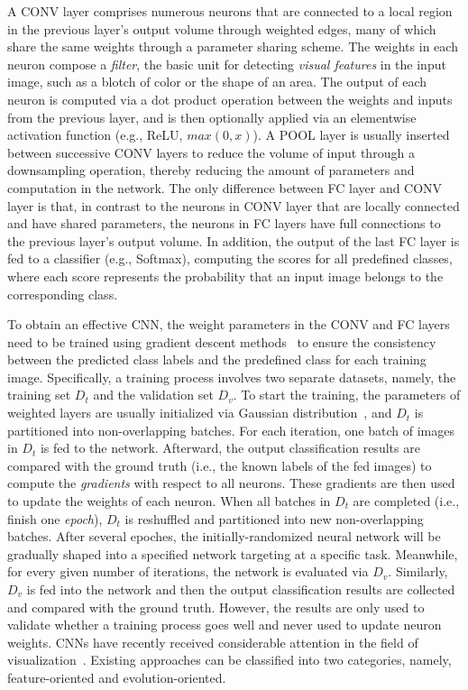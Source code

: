 \documentclass[format=acmsmall, review=false, screen=true]{acmart}
\begin{document}
A CONV layer comprises numerous neurons that are connected to a local region in the previous layer's output volume through weighted edges, many of which share the same weights through a parameter sharing scheme.
The weights in each neuron compose a \textit{filter}, the basic unit for detecting  \textit{visual features} in the input image, such as a blotch of color or the shape of an area.
The output of each neuron is computed via a dot product operation between the weights and inputs from the previous layer, and is then optionally applied via an elementwise activation function (e.g., ReLU, $max(0, x)$).
A POOL layer is usually inserted between successive CONV layers to reduce the volume of input through a downsampling operation, thereby reducing the amount of parameters and computation in the network.
The only difference between FC layer and CONV layer is that, in contrast to the neurons in CONV layer that are locally connected and have shared parameters, the neurons in FC layers have full connections to the previous layer's output volume. In addition, the output of the last FC layer is fed to a classifier (e.g., Softmax), computing the scores for all predefined classes, where each score represents the probability that an input image belongs to the corresponding class.


To obtain an effective CNN, the weight parameters in the CONV and FC layers need to be trained using gradient descent methods~\cite{bottou1991stochastic} to ensure the consistency between the predicted class labels and the predefined class for each training image.
Specifically, a training process involves two separate datasets, namely, the training set $\mathit{D_t}$ and the validation set $\mathit{D_v}$.
To start the training, the parameters of weighted layers are usually initialized via Gaussian distribution~\cite{glorot2010understanding}, and $\mathit{D_t}$ is partitioned into non-overlapping batches.
For each iteration, one batch of images in $\mathit{D_t}$ is fed to the network.
Afterward, the output classification results are compared with the ground truth (i.e., the known labels of the fed images) to compute the \textit{gradients} with respect to all neurons.
These gradients are then used to update the weights of each neuron.
When all batches in $\mathit{D_t}$ are completed (i.e., finish one \textit{epoch}), $D_t$ is reshuffled and partitioned into new non-overlapping batches.
After several epoches, the initially-randomized neural network will be gradually shaped into a specified network targeting at a specific task.
Meanwhile, for every given number of iterations, the network is evaluated via $\mathit{D_v}$.
Similarly, $D_v$ is fed into the network and then the output classification results are collected and compared with the ground truth.
However, the results are only used to validate whether a training process goes well and never used to update neuron weights.
CNNs have recently received considerable attention in the field of visualization~\cite{seifert2017visualizations}.
Existing approaches can be classified into two categories, namely, feature-oriented and evolution-oriented.
\end{document}
